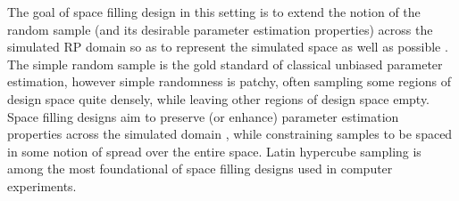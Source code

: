 \documentclass[12pt]{article}
\begin{document}
%	
%

%
The goal of space filling design in this setting is to extend the notion of the 
random sample (and its desirable parameter estimation properties) across the 
simulated RP domain so as to represent the simulated space as well as possible .
The simple random sample is the gold standard of classical unbiased parameter 
estimation, however simple randomness is patchy, often sampling some regions 
of design space quite densely, while leaving other regions of design space empty. 
Space filling designs aim to preserve (or enhance) parameter estimation properties 
across the simulated domain , 
while constraining samples to be spaced in some notion of spread over the entire space.
Latin hypercube sampling  is among the most 
foundational of space filling designs used in computer experiments.
\end{document}
